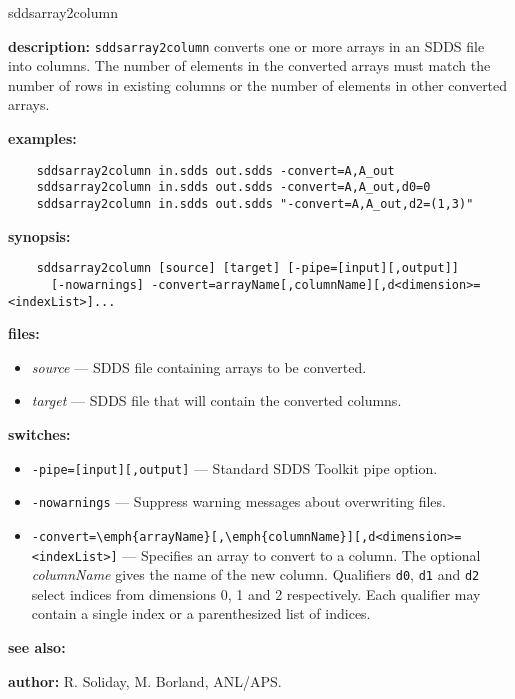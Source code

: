 \begin{sddsprog}{sddsarray2column}
  \item {\bf description:} \verb|sddsarray2column| converts one or more arrays in an SDDS file into columns. The number of elements in the converted arrays must match the number of rows in existing columns or the number of elements in other converted arrays.
  \item {\bf examples:}
    \begin{verbatim}
    sddsarray2column in.sdds out.sdds -convert=A,A_out
    sddsarray2column in.sdds out.sdds -convert=A,A_out,d0=0
    sddsarray2column in.sdds out.sdds "-convert=A,A_out,d2=(1,3)"
    \end{verbatim}
  \item {\bf synopsis:}
    \begin{verbatim}
    sddsarray2column [source] [target] [-pipe=[input][,output]]
      [-nowarnings] -convert=arrayName[,columnName][,d<dimension>=<indexList>]...
    \end{verbatim}
  \item {\bf files:}
    \begin{itemize}
      \item {\em source} --- SDDS file containing arrays to be converted.
      \item {\em target} --- SDDS file that will contain the converted columns.
    \end{itemize}
  \item {\bf switches:}
    \begin{itemize}
      \item \verb|-pipe=[input][,output]| --- Standard SDDS Toolkit pipe option.
      \item \verb|-nowarnings| --- Suppress warning messages about overwriting files.
      \item \verb|-convert=\emph{arrayName}[,\emph{columnName}][,d<dimension>=<indexList>]| --- Specifies an array to convert to a column. The optional \emph{columnName} gives the name of the new column. Qualifiers \verb|d0|, \verb|d1| and \verb|d2| select indices from dimensions 0, 1 and 2 respectively. Each qualifier may contain a single index or a parenthesized list of indices.
    \end{itemize}
  \item {\bf see also:} 
  \item {\bf author:} R. Soliday, M. Borland, ANL/APS.
\end{sddsprog}

